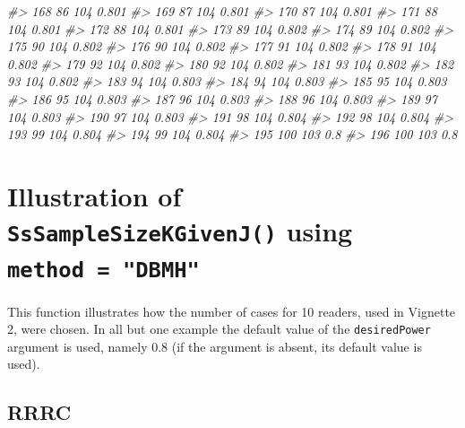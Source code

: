 \documentclass[]{book}
\newenvironment{Shaded}{\begin{snugshade}}{\end{snugshade}}
\newcommand{\CommentTok}[1]{\textcolor[rgb]{0.56,0.35,0.01}{\textit{#1}}}
\newcommand{\DataTypeTok}[1]{\textcolor[rgb]{0.13,0.29,0.53}{#1}}
\newcommand{\DecValTok}[1]{\textcolor[rgb]{0.00,0.00,0.81}{#1}}
\newcommand{\KeywordTok}[1]{\textcolor[rgb]{0.13,0.29,0.53}{\textbf{#1}}}
\newcommand{\NormalTok}[1]{#1}
\newcommand{\StringTok}[1]{\textcolor[rgb]{0.31,0.60,0.02}{#1}}
\begin{document}
\begin{Shaded}
\begin{Highlighting}[]
\CommentTok{#> 168         86      104 0.801}
\CommentTok{#> 169         87      104 0.801}
\CommentTok{#> 170         87      104 0.801}
\CommentTok{#> 171         88      104 0.801}
\CommentTok{#> 172         88      104 0.801}
\CommentTok{#> 173         89      104 0.802}
\CommentTok{#> 174         89      104 0.802}
\CommentTok{#> 175         90      104 0.802}
\CommentTok{#> 176         90      104 0.802}
\CommentTok{#> 177         91      104 0.802}
\CommentTok{#> 178         91      104 0.802}
\CommentTok{#> 179         92      104 0.802}
\CommentTok{#> 180         92      104 0.802}
\CommentTok{#> 181         93      104 0.802}
\CommentTok{#> 182         93      104 0.802}
\CommentTok{#> 183         94      104 0.803}
\CommentTok{#> 184         94      104 0.803}
\CommentTok{#> 185         95      104 0.803}
\CommentTok{#> 186         95      104 0.803}
\CommentTok{#> 187         96      104 0.803}
\CommentTok{#> 188         96      104 0.803}
\CommentTok{#> 189         97      104 0.803}
\CommentTok{#> 190         97      104 0.803}
\CommentTok{#> 191         98      104 0.804}
\CommentTok{#> 192         98      104 0.804}
\CommentTok{#> 193         99      104 0.804}
\CommentTok{#> 194         99      104 0.804}
\CommentTok{#> 195        100      103   0.8}
\CommentTok{#> 196        100      103   0.8}
\end{Highlighting}
\end{Shaded}

\hypertarget{illustration-of-sssamplesizekgivenj-using-method-dbmh}{%
\section{\texorpdfstring{Illustration of \texttt{SsSampleSizeKGivenJ()} using \texttt{method\ =\ "DBMH"}}{Illustration of SsSampleSizeKGivenJ() using method = "DBMH"}}\label{illustration-of-sssamplesizekgivenj-using-method-dbmh}}

This function illustrates how the number of cases for 10 readers, used in Vignette 2, were chosen. In all but one example the default value of the \texttt{desiredPower} argument is used, namely 0.8 (if the argument is absent, its default value is used).

\hypertarget{rrrc}{%
\subsection{RRRC}\label{rrrc}}

\begin{Shaded}
\end{Shaded}
\end{document}
